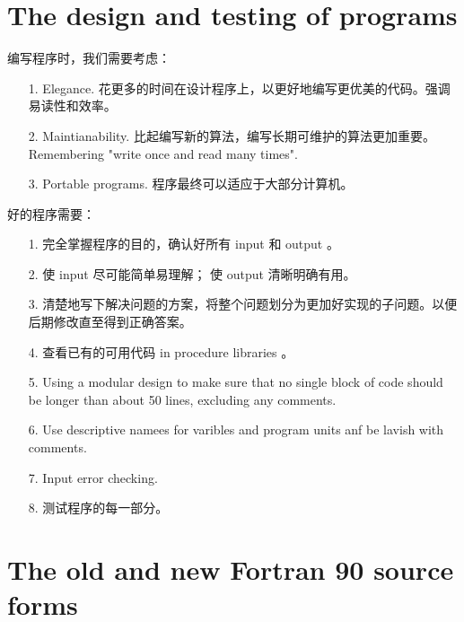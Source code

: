 \documentclass[a4paper,titlepage]{report}
\begin{document}
\section{The design and testing of programs}

编写程序时，我们需要考虑：
\begin{itemize}
  \item[1.]
  Elegance. 花更多的时间在设计程序上，以更好地编写更优美的代码。强调易读性和效率。

  \item[2.]
  Maintianability. 比起编写新的算法，编写长期可维护的算法更加重要。Remembering "write once and read many times".

  \item[3.]
  Portable programs. 程序最终可以适应于大部分计算机。

\end{itemize}

好的程序需要：
\begin{itemize}
  \item[1.]
  完全掌握程序的目的，确认好所有 input 和 output 。

  \item[2.]
  使 input 尽可能简单易理解； 使 output 清晰明确有用。

  \item[3.]
  清楚地写下解决问题的方案，将整个问题划分为更加好实现的子问题。以便后期修改直至得到正确答案。

  \item[4.]
  查看已有的可用代码 in procedure libraries 。

  \item[5.]
  Using a modular design to make sure that no single block of code should be longer than about 50 lines, excluding any comments.

  \item[6.]
  Use descriptive namees for varibles and program units anf be lavish with comments.

  \item[7.]
  Input error checking.

  \item[8.]
  测试程序的每一部分。

\end{itemize}

\section{The old and new Fortran 90 source forms}
\end{document}
